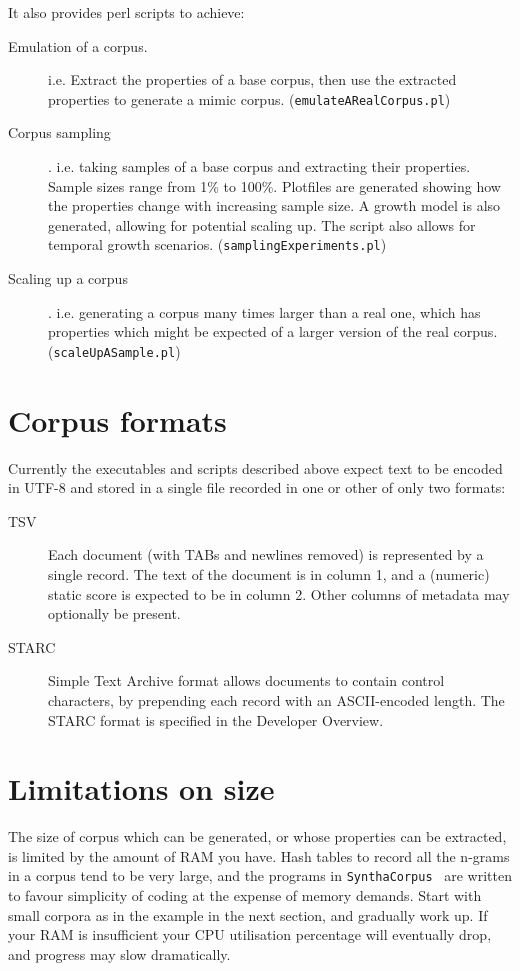 \documentclass{article}
\newcommand{\projectName}{\texttt{SynthaCorpus}}
\begin{document}
It also provides perl scripts to achieve:
\begin{description}
\item [Emulation of a corpus.] i.e. Extract the properties of a base
  corpus, then use the extracted properties to generate a mimic corpus.
  (\texttt{emulateARealCorpus.pl})
\item [Corpus sampling]. i.e. taking samples of a base corpus and
  extracting their properties.  Sample sizes range from 1\% to 100\%.
  Plotfiles are generated showing how the properties change with
  increasing sample size.  A growth model is also generated, allowing
  for potential scaling up.  The script also allows for temporal growth
  scenarios. (\texttt{samplingExperiments.pl})
\item [Scaling up a corpus]. i.e. generating a corpus many times
  larger than a real one, which has properties which might be expected
  of a larger version of the real corpus. (\texttt{scaleUpASample.pl})
\end{description}


\section{Corpus formats}
Currently the executables and scripts described above expect text to
be encoded in UTF-8 and stored in a single file recorded in one or
other of only two formats:
\begin{description}
  \item[TSV] Each document (with TABs and newlines removed) is
    represented by a single record.  The text of the document is in
    column 1, and a (numeric) static score is expected to be in column
    2. Other columns of metadata may optionally be present.
  \item[STARC] Simple Text Archive format allows documents to contain
    control characters, by prepending each record with an
    ASCII-encoded length.  The STARC format is specified in the
    Developer Overview.
\end{description}



\section{Limitations on size}
The size of corpus which can be generated, or whose properties can be
extracted, is limited by the amount of RAM you have.   Hash tables to
record all the n-grams in a corpus tend to be very large, and the programs in
\projectName~ are written to favour simplicity of coding at the expense of
memory demands.  Start with small corpora as in the example in the
next section, and gradually work up.  If your RAM is insufficient your
CPU utilisation percentage will eventually drop, and progress may slow
dramatically.
\end{document}
